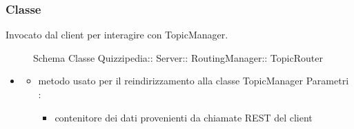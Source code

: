 \subsubsection{Classe }
Invocato dal client per interagire con TopicManager.
\begin{figure}[H]
\centering
\noindent{}
\caption[Schema Classe TopicRouter]{Schema Classe Quizzipedia:: Server:: RoutingManager:: TopicRouter}
\end{figure}
\begin{itemize}
\item {}
\begin{itemize}
\item {}
\newline
metodo usato per il reindirizzamento alla classe TopicManager
\newline
Parametri :
\begin{itemize}
\item {}
\newline
contenitore dei dati provenienti da chiamate REST del client
\end{itemize}
\end{itemize}
\end{itemize}
